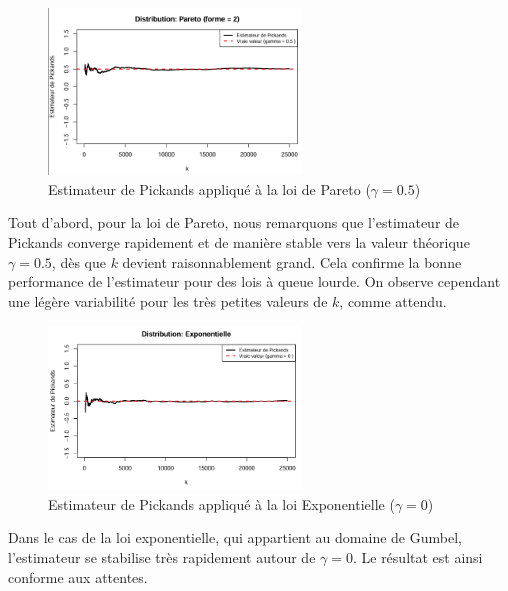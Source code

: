 \documentclass{article}
\theoremstyle{plain}
\theoremstyle{definition}
\theoremstyle{plain}
\begin{document}
\begin{figure}[H]
    \centering
    \includegraphics[width=0.6\textwidth]{./image_hill_pickands/pareto_pickands.png}
    \caption{Estimateur de Pickands appliqué à la loi de Pareto ($\gamma = 0.5$)}
\end{figure}
Tout d'abord, pour la loi de Pareto, nous remarquons que l'estimateur de Pickands converge rapidement et de manière stable vers la valeur théorique $\gamma = 0.5$, dès que $k$ devient raisonnablement grand. Cela confirme la bonne performance de l’estimateur pour des lois à queue lourde. On observe cependant une légère variabilité pour les très petites valeurs de $k$, comme attendu.


\begin{figure}[H]
    \centering
    \includegraphics[width=0.6\textwidth]{./image_hill_pickands/exponentielle_pickands.png}
    \caption{Estimateur de Pickands appliqué à la loi Exponentielle ($\gamma = 0$)}
\end{figure}
Dans le cas de la loi exponentielle, qui appartient au domaine de Gumbel, l’estimateur se stabilise très rapidement autour de $\gamma = 0$. Le résultat est ainsi conforme aux attentes.
\end{document}
